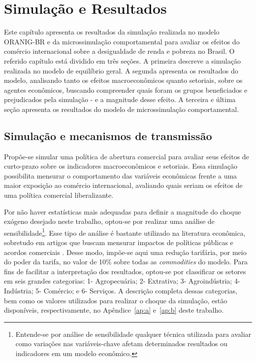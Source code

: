 

\chapter{Simulação e Resultados} \label{cha:resultados}

Este capítulo apresenta os resultados da simulação realizada no modelo ORANIG-BR e da microssimulação comportamental para avaliar os efeitos do comércio internacional sobre a desigualdade de renda e pobreza no Brasil. O referido capítulo está dividido em três seções. A primeira descreve a simulação realizada no modelo de equilíbrio geral. A segunda apresenta os resultados do modelo, analisando tanto os efeitos macroeconômicos quanto setoriais, sobre os agentes econômicos, buscando compreender quais foram os grupos beneficiados e prejudicados pela simulação - e a magnitude desse efeito. A terceira e última seção apresenta os resultados do modelo de microssimulação comportamental.



\section{Simulação e mecanismos de transmissão} \label{sec:simulacao}

Propõe-se simular uma política de abertura comercial para avaliar seus efeitos de curto-prazo sobre os indicadores macroeconômicos e setoriais. Essa simulação possibilita mensurar o comportamento das variáveis econômicas frente a uma maior exposição ao comércio internacional, avaliando quais seriam os efeitos de uma política comercial liberalizante.

Por não haver estatísticas mais adequadas para definir a magnitude do choque exógeno desejado neste trabalho, optou-se por realizar uma análise de sensibilidade\footnote{Entende-se por análise de sensibilidade qualquer técnica utilizada para avaliar como variações nas variáveis-chave afetam determinados resultados ou indicadores em um modelo econômico.}. Esse tipo de análise é bastante utilizado na literatura econômica, sobretudo em artigos que buscam mensurar impactos de políticas públicas e acordos comerciais \cite{haddad05, domingues08,perobelli17}. Desse modo, impõe-se aqui uma redução tarifária, por meio do poder da tarifa, no valor de 10\% sobre todas as \textit{commodities} do modelo. Para fins de facilitar a interpretação dos resultados, optou-se por classificar os setores em seis grandes categorias: 1- Agropecuária; 2- Extrativa; 3- Agroindústria; 4- Indústria; 5- Comércio; e 6- Serviços. A descrição completa dessas categorias, bem como os valores utilizados para realizar o choque da simulação, estão disponíveis, respectivamente, no Apêndice~\ref{ap:a} e~\ref{ap:b} deste trabalho.

